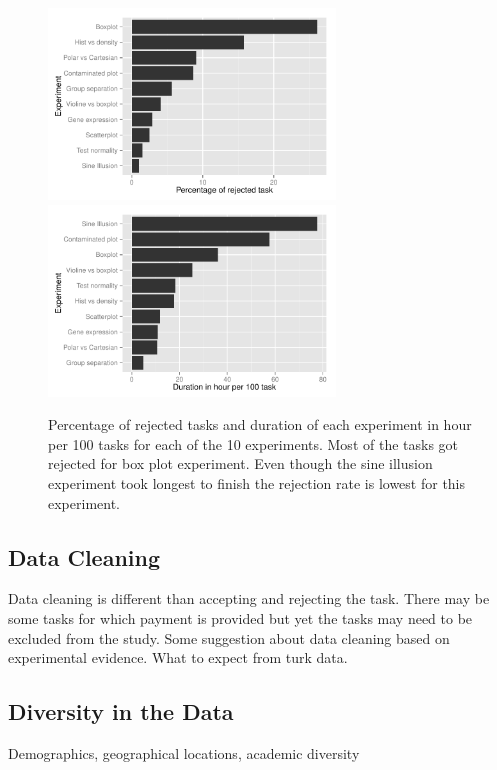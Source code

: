 \documentclass[11pt]{article}
\begin{document}
\begin{figure}[htbp] 
   \centering
   \includegraphics[width=3in]{rejected_task.pdf}
      \includegraphics[width=3in]{task_duration.pdf} 
   \caption{Percentage of rejected tasks and duration of each experiment in hour per 100 tasks for each of the 10 experiments. Most of the tasks got rejected for box plot experiment.  Even though the sine illusion experiment took longest to finish the rejection rate is lowest for this experiment.}
   \label{fig:task_duration}
\end{figure}


\subsection{Data Cleaning} Data cleaning is different than accepting and rejecting the task. There may be some tasks for which payment is provided but yet the tasks may need to be excluded from the study. Some suggestion about data cleaning based on experimental evidence. What to expect from turk data.

\subsection{Diversity in the Data} Demographics, geographical locations, academic diversity

\end{document}
